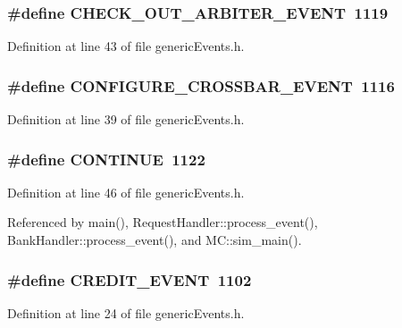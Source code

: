 \subsubsection[{CHECK\_\-OUT\_\-ARBITER\_\-EVENT}]{\setlength{\rightskip}{0pt plus 5cm}\#define CHECK\_\-OUT\_\-ARBITER\_\-EVENT~1119}\label{genericEvents_8h_8a7cedeaf64e06ec8243985a1a64e5b5}




Definition at line 43 of file genericEvents.h.
\subsubsection[{CONFIGURE\_\-CROSSBAR\_\-EVENT}]{\setlength{\rightskip}{0pt plus 5cm}\#define CONFIGURE\_\-CROSSBAR\_\-EVENT~1116}\label{genericEvents_8h_d04f329560eb202b948607b09dca5cdc}




Definition at line 39 of file genericEvents.h.
\subsubsection[{CONTINUE}]{\setlength{\rightskip}{0pt plus 5cm}\#define CONTINUE~1122}\label{genericEvents_8h_b711666ad09d7f6c0b91576525ea158e}




Definition at line 46 of file genericEvents.h.

Referenced by main(), RequestHandler::process\_\-event(), BankHandler::process\_\-event(), and MC::sim\_\-main().
\subsubsection[{CREDIT\_\-EVENT}]{\setlength{\rightskip}{0pt plus 5cm}\#define CREDIT\_\-EVENT~1102}\label{genericEvents_8h_b3d441967d1bee2d70c59018d4085a33}




Definition at line 24 of file genericEvents.h.
